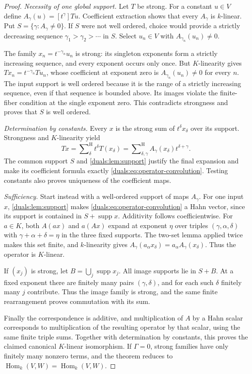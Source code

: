 \documentclass[11pt,letterpaper]{article}
\numberwithin{equation}{section}
\theoremstyle{definition}
\theoremstyle{remark}
\newcommand{\supp}{\operatorname{supp}}
\newcommand{\Hom}{\operatorname{Hom}}
\newcommand{\sH}{\mathop{\sum}\nolimits^{\mathrm H}}
\begin{document}
\begin{proof}
\emph{Necessity of one global support.}
Let $T$ be strong. For a constant $u\in V$ define
$A_\gamma(u)=[t^\gamma]Tu$. Coefficient extraction shows that every
$A_\gamma$ is $k$-linear. Put $S=\{\gamma:A_\gamma\ne0\}$.
If $S$ were not well ordered, choice would provide a strictly decreasing
sequence $\gamma_1>\gamma_2>\cdots$ in $S$. Select $u_n\in V$ with
$A_{\gamma_n}(u_n)\ne0$.

The family $x_n=t^{-\gamma_n}u_n$ is strong: its singleton exponents
form a strictly increasing sequence, and every exponent occurs only
once. But $K$-linearity gives $Tx_n=t^{-\gamma_n}Tu_n$, whose coefficient
at exponent zero is $A_{\gamma_n}(u_n)\ne0$ for every $n$. The input
support is well ordered because it is the range of a strictly increasing
sequence, even if that sequence is bounded above. Its images violate
the finite-fiber condition at the single exponent zero. This contradicts
strongness and proves that $S$ is well ordered.

\emph{Determination by constants.}
Every $x$ is the strong sum of $t^\delta x_\delta$ over its support.
Strongness and $K$-linearity yield
\[
 Tx=\sH_\delta t^\delta T(x_\delta)
   =\sH_{\delta,\gamma}A_\gamma(x_\delta)t^{\delta+\gamma}.
\]
The common support $S$ and \cref{duals:lem:support} justify the final
expansion and make its coefficient formula exactly
\eqref{duals:eq:operator-convolution}. Testing constants also proves
uniqueness of the coefficient maps.

\emph{Sufficiency.}
Start instead with a well-ordered support of maps $A_\gamma$.
For one input $x$, \cref{duals:lem:support} makes
\eqref{duals:eq:operator-convolution} a Hahn vector, since its support
is contained in $S+\supp x$. Additivity follows coefficientwise.
For $a\in K$, both $A(ax)$ and $a(Ax)$ expand at exponent $\eta$ over
triples $(\gamma,\alpha,\delta)$ with
$\gamma+\alpha+\delta=\eta$ in the three fixed supports. The two-set
lemma applied twice makes this set finite, and $k$-linearity gives
$A_\gamma(a_\alpha x_\delta)=a_\alpha A_\gamma(x_\delta)$.
Thus the operator is $K$-linear.

If $(x_j)$ is strong, let $B=\bigcup_j\supp x_j$.
All image supports lie in $S+B$. At a fixed exponent there are finitely
many pairs $(\gamma,\delta)$, and for each such $\delta$ finitely many
$j$ contribute. Thus the image family is strong, and the same finite
rearrangement proves commutation with its sum.

Finally the correspondence
is additive, and multiplication of $A$ by a Hahn scalar corresponds to
multiplication of the resulting operator by that scalar, using the same
finite triple sums. Together with determination by constants, this
proves the claimed canonical $K$-linear isomorphism. If $\Gamma=0$,
strong families have only finitely many nonzero terms, and the theorem
reduces to $\Hom_k(V,W)=\Hom_k(V,W)$.
\end{proof}
\end{document}
